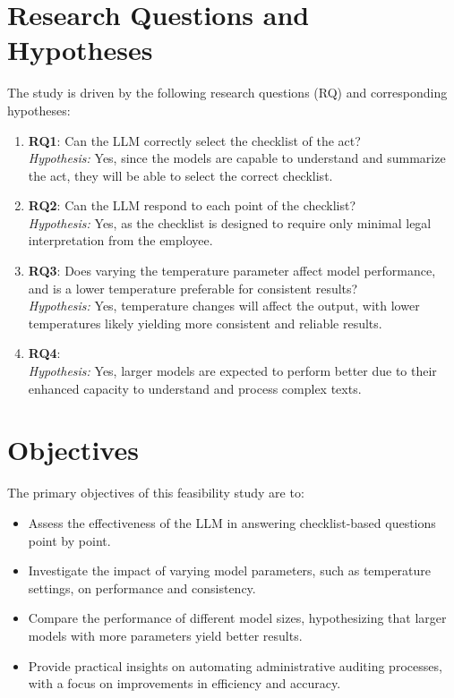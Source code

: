 \documentclass[../main.tex]{subfiles}
\begin{document}
\section{Research Questions and Hypotheses}
The study is driven by the following research questions (RQ) and corresponding hypotheses:
\begin{enumerate}

    \item \textbf{RQ1}: Can the LLM correctly select the checklist of the act?
    \\
    \textit{Hypothesis:} Yes, since the models are capable to understand and summarize the act, they will be able to select the correct checklist.
    
    \item \textbf{RQ2}: Can the LLM respond to each point of the checklist?
    \\
    \textit{Hypothesis:} Yes, as the checklist is designed to require only minimal legal interpretation from the employee.
    
    \item \textbf{RQ3}: Does varying the temperature parameter affect model performance, and is a lower temperature preferable for consistent results?
    \\
    \textit{Hypothesis:} Yes, temperature changes will affect the output, with lower temperatures likely yielding more consistent and reliable results.
    
    \item \textbf{RQ4}:  
    \\
    \textit{Hypothesis:} Yes, larger models are expected to perform better due to their enhanced capacity to understand and process complex texts.


\end{enumerate}

\section{Objectives}
The primary objectives of this feasibility study are to:
\begin{itemize}
    \item Assess the effectiveness of the LLM in answering checklist-based questions point by point.
    \item Investigate the impact of varying model parameters, such as temperature settings, on performance and consistency.
    \item Compare the performance of different model sizes, hypothesizing that larger models with more parameters yield better results.
    \item Provide practical insights on automating administrative auditing processes, with a focus on improvements in efficiency and accuracy.
\end{itemize}
\end{document}
